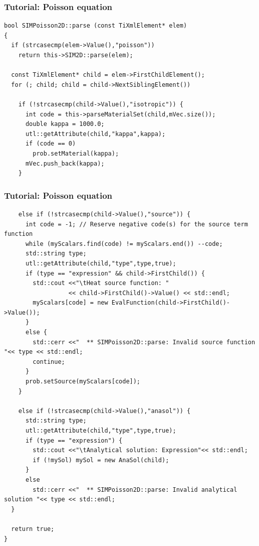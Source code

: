 \documentclass{beamer}
\begin{document}
\begin{frame}[fragile] %
 \frametitle{Tutorial: Poisson equation}

 \tiny\begin{verbatim}
bool SIMPoisson2D::parse (const TiXmlElement* elem)
{
  if (strcasecmp(elem->Value(),"poisson"))
    return this->SIM2D::parse(elem);

  const TiXmlElement* child = elem->FirstChildElement();
  for (; child; child = child->NextSiblingElement())

    if (!strcasecmp(child->Value(),"isotropic")) {
      int code = this->parseMaterialSet(child,mVec.size());
      double kappa = 1000.0;
      utl::getAttribute(child,"kappa",kappa);
      if (code == 0)
        prob.setMaterial(kappa);
      mVec.push_back(kappa);
    }
 \end{verbatim}
\end{frame}
\begin{frame}[fragile] %
 \frametitle{Tutorial: Poisson equation}

 \tiny\begin{verbatim}
    else if (!strcasecmp(child->Value(),"source")) {
      int code = -1; // Reserve negative code(s) for the source term function
      while (myScalars.find(code) != myScalars.end()) --code;
      std::string type;
      utl::getAttribute(child,"type",type,true);
      if (type == "expression" && child->FirstChild()) {
        std::cout <<"\tHeat source function: "
                  << child->FirstChild()->Value() << std::endl;
        myScalars[code] = new EvalFunction(child->FirstChild()->Value());
      }
      else {
        std::cerr <<"  ** SIMPoisson2D::parse: Invalid source function "<< type << std::endl;
        continue;
      }
      prob.setSource(myScalars[code]);
    }

    else if (!strcasecmp(child->Value(),"anasol")) {
      std::string type;
      utl::getAttribute(child,"type",type,true);
      if (type == "expression") {
        std::cout <<"\tAnalytical solution: Expression"<< std::endl;
        if (!mySol) mySol = new AnaSol(child);
      }
      else
        std::cerr <<"  ** SIMPoisson2D::parse: Invalid analytical solution "<< type << std::endl;
  }

  return true;
}
 \end{verbatim}
\end{frame}
\end{document}
